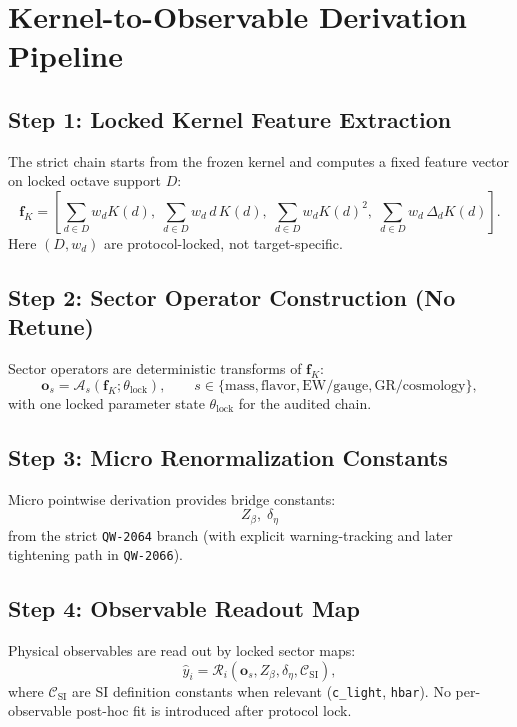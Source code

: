 \documentclass[11pt,a4paper]{article}
\newcommand{\QW}[1]{\texttt{QW-#1}}
\begin{document}
\section{Kernel-to-Observable Derivation Pipeline}
\label{sec:kernel_to_observable_pipeline}
\subsection{Step 1: Locked Kernel Feature Extraction}
The strict chain starts from the frozen kernel and computes a fixed feature vector on locked octave support $D$:
\begin{equation}
\mathbf{f}_{K}
=
\left[
\sum_{d\in D} w_d K(d),\;
\sum_{d\in D} w_d\, d\, K(d),\;
\sum_{d\in D} w_d K(d)^2,\;
\sum_{d\in D} w_d\,\Delta_d K(d)
\right].
\end{equation}
Here $(D,w_d)$ are protocol-locked, not target-specific.

\subsection{Step 2: Sector Operator Construction (No Retune)}
Sector operators are deterministic transforms of $\mathbf{f}_K$:
\begin{equation}
\mathbf{o}_{s} = \mathcal{A}_{s}\!\left(\mathbf{f}_{K};\theta_{\mathrm{lock}}\right),
\qquad
s\in\{\text{mass},\text{flavor},\text{EW/gauge},\text{GR/cosmology}\},
\end{equation}
with one locked parameter state $\theta_{\mathrm{lock}}$ for the audited chain.

\subsection{Step 3: Micro Renormalization Constants}
Micro pointwise derivation provides bridge constants:
\[
Z_{\beta},\;\delta_{\eta}
\]
from the strict \QW{2064} branch (with explicit warning-tracking and later tightening path in \QW{2066}).

\subsection{Step 4: Observable Readout Map}
Physical observables are read out by locked sector maps:
\begin{equation}
\widehat{y}_i
=
\mathcal{R}_i\!\left(\mathbf{o}_s,Z_\beta,\delta_\eta,\mathcal{C}_{\mathrm{SI}}\right),
\end{equation}
where $\mathcal{C}_{\mathrm{SI}}$ are SI definition constants when relevant (\texttt{c\_light}, \texttt{hbar}).
No per-observable post-hoc fit is introduced after protocol lock.
\end{document}
